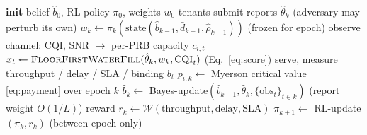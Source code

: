 \documentclass[conference]{IEEEtran}
\theoremstyle{definition}
\theoremstyle{remark}
\newcommand{\Ep}{L}
\newcommand{\Neps}{K}
\newcommand{\rhobind}{\rho}
\newcommand{\type}{\theta}
\newcommand{\alloc}{x}
\newcommand{\wt}{w}
\newcommand{\bindind}{b}
\newcommand{\Wel}{\mathcal{W}}
\begin{document}
\begin{algorithm}[t]
\caption{Epoch-frozen DSIC-RL PRB allocation}\label{alg:main}
\begin{algorithmic}[1]
\STATE \textbf{init} belief $\hat b_0$, RL policy $\pi_0$, weights $\wt_0$
\FOR{epoch $k=0,1,\dots,\Neps-1$}
  \STATE tenants submit reports $\hat\type_k$ (adversary may perturb its own)
  \STATE $\wt_k \leftarrow \pi_k(\text{state}(\hat b_{k-1},\bar d_{k-1},\hat\rhobind_{k-1}))$ \hfill{\footnotesize(frozen for epoch)}
    \STATE observe channel: CQI, SNR $\to$ per-PRB capacity $c_{i,t}$
    \STATE $\alloc_t \leftarrow \textsc{FloorFirstWaterFill}(\hat\type_k,\wt_k,\text{CQI}_t)$ \hfill{\footnotesize(Eq.~\eqref{eq:score})}
    \STATE serve, measure throughput / delay / SLA / binding $\bindind_t$
  \ENDFOR
  \STATE $p_{i,k}\leftarrow$ Myerson critical value \eqref{eq:payment} over epoch $k$
  \STATE $\hat b_k \leftarrow$ Bayes-update$(\hat b_{k-1}, \hat\type_k, \{\text{obs}_t\}_{t\in k})$ \hfill{\footnotesize(report weight $O(1/\Ep)$)}
  \STATE reward $r_k\leftarrow \Wel(\text{throughput},\text{delay},\text{SLA})$
  \STATE $\pi_{k+1}\leftarrow$ RL-update$(\pi_k, r_k)$ \hfill{\footnotesize(between-epoch only)}
\ENDFOR
\end{algorithmic}
\end{algorithm}
\end{document}
